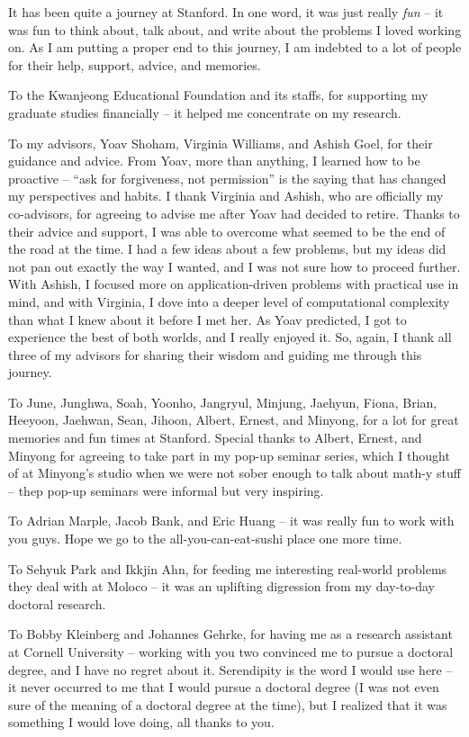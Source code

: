 It has been quite a journey at Stanford.
In one word, it was just really {\em fun} -- it was fun to think about, talk about, and write about the problems I loved working on. 
As I am putting a proper end to this journey, I am indebted to a lot of people for their help, support, advice, and memories.

To the Kwanjeong Educational Foundation and its staffs, for supporting my graduate studies financially -- it helped me concentrate on my research.

To my advisors, Yoav Shoham, Virginia Williams, and Ashish Goel, for their guidance and advice. From Yoav, more than anything, I learned how to be proactive -- ``ask for forgiveness, not permission'' is the saying that has changed my perspectives and habits. I thank Virginia and Ashish, who are officially my co-advisors, for agreeing to advise me after Yoav had decided to retire. Thanks to their advice and support, I was able to overcome what seemed to be the end of the road at the time. I had a few ideas about a few problems, but my ideas did not pan out exactly the way I wanted, and I was not sure how to proceed further. With Ashish, I focused more on application-driven problems with practical use in mind, and with Virginia, I dove into a deeper level of computational complexity than what I knew about it before I met her. As Yoav predicted, I got to experience the best of both worlds, and I really enjoyed it. So, again, I thank all three of my advisors for sharing their wisdom and guiding me through this journey.

To June, Junghwa, Soah, Yoonho, Jangryul, Minjung, Jaehyun, Fiona, Brian, Heeyoon, Jaehwan, Sean, Jihoon, Albert, Ernest, and Minyong, for a lot for great memories and fun times at Stanford. Special thanks to Albert, Ernest, and Minyong for agreeing to take part in my pop-up seminar series, which I thought of at Minyong's studio when we were not sober enough to talk about math-y stuff  -- thep pop-up seminars were informal but very inspiring. 

To Adrian Marple, Jacob Bank, and Eric Huang -- it was really fun to work with you guys. Hope we go to the all-you-can-eat-sushi place one more time.

To Sehyuk Park and Ikkjin Ahn, for feeding me interesting real-world problems they deal with at Moloco -- it was an uplifting digression from my day-to-day doctoral research.

To Bobby Kleinberg and Johannes Gehrke, for having me as a research assistant at Cornell University -- working with you two convinced me to pursue a doctoral degree, and I have no regret about it. Serendipity is the word I would use here -- it never occurred to me that I would pursue a doctoral degree (I was not even sure of the meaning of a doctoral degree at the time), but I realized that it was something I would love doing, all thanks to you. 

